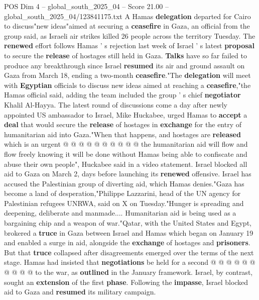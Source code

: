 \begin{textsample}{POS Dim 4 – global\_south\_2025\_04 – Score 21.00 – global\_south\_2025\_04/123841175.txt}  \label{ex:f4_pos_244}
A Hamas \textbf{delegation} departed for Cairo to discuss"new ideas"aimed at securing a \textbf{ceasefire} in Gaza, an official from the group said, as Israeli air strikes killed 26 people across the territory Tuesday.
The \textbf{renewed} effort follows Hamas ' s rejection last week of Israel ' s latest \textbf{proposal} to secure the \textbf{release} of hostages still held in Gaza. \textbf{Talks} have so far failed to produce any breakthrough since Israel \textbf{resumed} its air and ground assault on Gaza from March 18, ending a two-month \textbf{ceasefire}."The \textbf{delegation} will meet with \textbf{Egyptian} officials to discuss new ideas aimed at reaching a \textbf{ceasefire},"the Hamas official said, adding the team included the group ' s chief \textbf{negotiator} Khalil Al-Hayya.
The latest round of discussions come a day after newly appointed US ambassador to Israel, Mike Huckabee, urged Hamas to \textbf{accept} a \textbf{deal} that would secure the \textbf{release} of hostages in \textbf{exchange} for the entry of humanitarian aid into Gaza."When that happens, and hostages are \textbf{released} which is an urgent @ @ @ @ @ @ @ @ @ @ the humanitarian aid will flow and flow freely knowing it will be done without Hamas being able to confiscate and abuse their own people", Huckabee said in a video statement.
Israel blocked all aid to Gaza on March 2, days before launching its \textbf{renewed} offensive.
Israel has accused the Palestinian group of diverting aid, which Hamas denies."Gaza has become a land of desperation,"Philippe Lazzarini, head of the UN agency for Palestinian refugees UNRWA, said on X on Tuesday."Hunger is spreading and deepening, deliberate and manmade....
Humanitarian aid is being used as a bargaining chip and a weapon of war."Qatar, with the United States and Egypt, brokered a \textbf{truce} in Gaza between Israel and Hamas which began on January 19 and enabled a surge in aid, alongside the \textbf{exchange} of hostages and \textbf{prisoners}.
But that \textbf{truce} collapsed after disagreements emerged over the terms of the next stage.
Hamas had insisted that \textbf{negotiations} be held for a second @ @ @ @ @ @ @ @ @ @ to the war, as \textbf{outlined} in the January framework.
Israel, by contrast, sought an \textbf{extension} of the first \textbf{phase}.
Following the \textbf{impasse}, Israel blocked aid to Gaza and \textbf{resumed} its military campaign.

\end{textsample}
